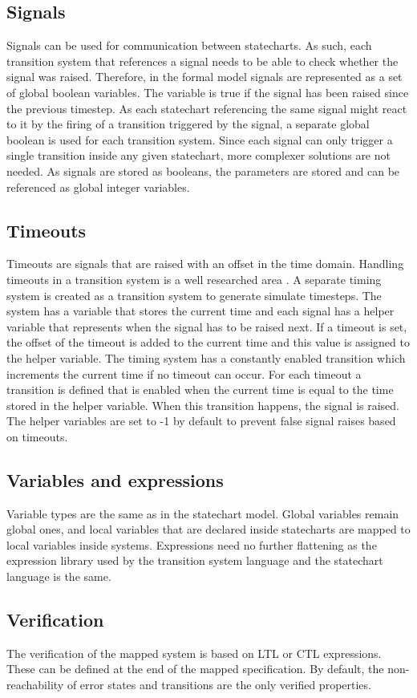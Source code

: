   \subsection{Signals}
Signals can be used for communication between statecharts. As such, each transition system that references a signal needs to be able to check whether the signal was raised. Therefore, in the formal model signals are represented as a set of global boolean variables. The variable is true if the signal has been raised since the previous timestep. As each statechart referencing the same signal might react to it by the firing of a transition triggered by the signal, a separate global boolean is used for each transition system. Since each signal can only trigger a single transition inside any given statechart, more complexer solutions are not needed. As signals are stored as booleans, the parameters are stored and can be referenced as global integer variables.
  \subsection{Timeouts}
Timeouts are signals that are raised with an offset in the time domain. Handling timeouts in a transition system is a well researched area \cite{dutertre2004timed}. A separate timing system is created as a transition system to generate simulate timesteps. The system has a variable that stores the current time and each signal has a helper variable that represents when the signal has to be raised next. If a timeout is set, the offset of the timeout is added to the current time and this value is assigned to the helper variable. The timing system has a constantly enabled transition which increments the current time if no timeout can occur. For each timeout a transition is defined that is enabled when the current time is equal to the time stored in the helper variable. When this transition happens, the signal is raised. The helper variables are set to -1 by default to prevent false signal raises based on timeouts.
  \subsection{Variables and expressions}
Variable types are the same as in the statechart model. Global variables remain global ones, and local variables that are declared inside statecharts are mapped to local variables inside systems. Expressions need no further flattening as the expression library used by the transition system language and the statechart language is the same.
  \subsection{Verification}
The verification of the mapped system is based on LTL or CTL expressions. These can be defined at the end of the mapped specification. By default, the non-reachability of error states and transitions are the only verified properties.

